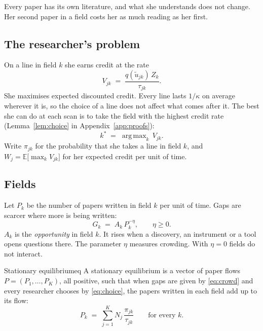 \documentclass[11pt,letterpaper]{article}
\newcommand{\E}{\mathbb{E}}
\newcommand{\ut}{\tilde u}
\DeclareMathOperator*{\argmax}{arg\,max}
\begin{document}
Every paper has its own literature, and what she understands does not change. Her second paper in a field costs her as much reading as her first.

\subsection{The researcher's problem}

On a line in field $k$ she earns credit at the rate
\begin{equation}\label{eq:V}
V_{jk}\;=\;\frac{q(\ut_{jk})\,Z_k}{\tau_{jk}} .
\end{equation}
She maximises expected discounted credit. Every line lasts $1/\kappa$ on average wherever it is, so the choice of a line does not affect what comes after it. The best she can do at each scan is to take the field with the highest credit rate (Lemma~\ref{lem:choice} in Appendix~\ref{app:proofs}):
\begin{equation}\label{eq:choice}
k^{*}\;=\;\argmax_{k}\,V_{jk}.
\end{equation}
Write $\pi_{jk}$ for the probability that she takes a line in field $k$, and $W_j=\E\big[\max_k V_{jk}\big]$ for her expected credit per unit of time.

\subsection{Fields}

Let $P_k$ be the number of papers written in field $k$ per unit of time. Gaps are scarcer where more is being written:
\begin{equation}\label{eq:crowd}
G_k\;=\;A_k\,P_k^{-\eta},\qquad \eta\ge 0 .
\end{equation}
$A_k$ is the \emph{opportunity} in field $k$. It rises when a discovery, an instrument or a tool opens questions there. The parameter $\eta$ measures crowding. With $\eta=0$ fields do not interact.

\begin{defn}{Stationary equilibrium}{eq}
A stationary equilibrium is a vector of paper flows $P=(P_1,\dots,P_K)$, all positive, such that when gaps are given by \eqref{eq:crowd} and every researcher chooses by \eqref{eq:choice}, the papers written in each field add up to its flow:
\begin{equation}\label{eq:flow}
P_k\;=\;\sum_{j=1}^{K} N_j\,\frac{\pi_{jk}}{\tau_{jk}}\qquad\text{for every } k .
\end{equation}
\end{defn}
\end{document}
